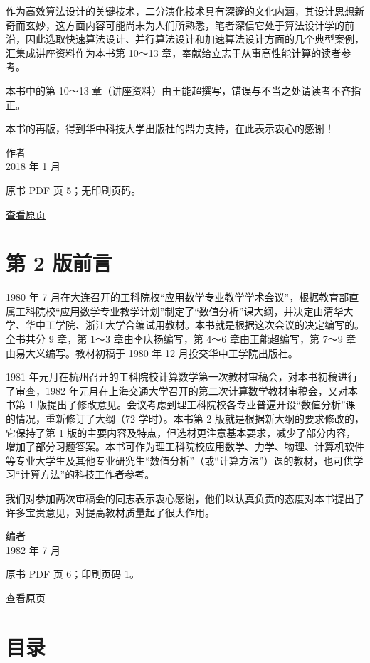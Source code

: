作为高效算法设计的关键技术，二分演化技术具有深邃的文化内涵，其设计思想新奇而玄妙，这方面内容可能尚未为人们所熟悉，笔者深信它处于算法设计学的前沿，因此选取快速算法设计、并行算法设计和加速算法设计方面的几个典型案例，汇集成讲座资料作为本书第 10～13 章，奉献给立志于从事高性能计算的读者参考。

本书中的第 10～13 章（讲座资料）由王能超撰写，错误与不当之处请读者不吝指正。

本书的再版，得到华中科技大学出版社的鼎力支持，在此表示衷心的感谢！

作者\\
2018 年 1 月

\clearpage

原书 PDF 页 5；无印刷页码。

\href{source-images/pdf-005.jpeg}{查看原页}

\section{第 2 版前言}\label{front-ux7b2c-2-ux7248ux524dux8a00}

1980 年 7 月在大连召开的工科院校``应用数学专业教学学术会议''，根据教育部直属工科院校``应用数学专业教学计划''制定了``数值分析''课大纲，并决定由清华大学、华中工学院、浙江大学合编试用教材。本书就是根据这次会议的决定编写的。全书共分 9 章，第 1～3 章由李庆扬编写，第 4～6 章由王能超编写，第 7～9 章由易大义编写。教材初稿于 1980 年 12 月投交华中工学院出版社。

1981 年元月在杭州召开的工科院校计算数学第一次教材审稿会，对本书初稿进行了审查，1982 年元月在上海交通大学召开的第二次计算数学教材审稿会，又对本书第 1 版提出了修改意见。会议考虑到理工科院校各专业普遍开设``数值分析''课的情况，重新修订了大纲（72 学时）。本书第 2 版就是根据新大纲的要求修改的，它保持了第 1 版的主要内容及特点，但选材更注意基本要求，减少了部分内容，增加了部分习题答案。本书可作为理工科院校应用数学、力学、物理、计算机软件等专业大学生及其他专业研究生``数值分析''（或``计算方法''）课的教材，也可供学习``计算方法''的科技工作者参考。

我们对参加两次审稿会的同志表示衷心感谢，他们以认真负责的态度对本书提出了许多宝贵意见，对提高教材质量起了很大作用。

编者\\
1982 年 7 月

\clearpage

原书 PDF 页 6；印刷页码 1。

\href{source-images/pdf-006.jpeg}{查看原页}

\section{目录}\label{front-ux76eeux5f55}

